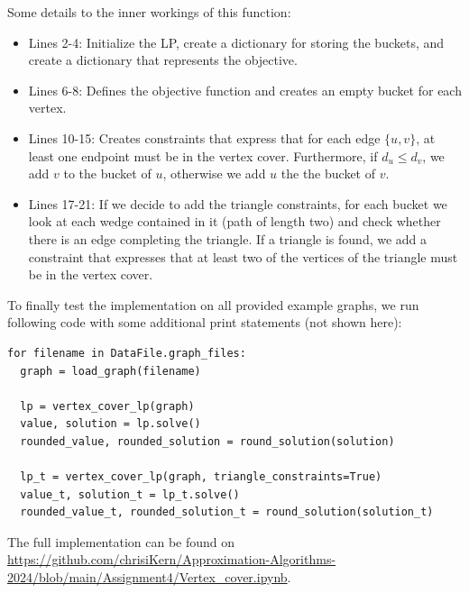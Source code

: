 \documentclass{article}
\begin{document}
Some details to the inner workings of this function:
\begin{itemize}
    \item Lines 2-4: Initialize the LP, create a dictionary for storing the buckets, and create a dictionary that represents the objective. 
    \item Lines 6-8: Defines the objective function and creates an empty bucket for each vertex.
    \item Lines 10-15: Creates constraints that express that for each edge $\{u,v\}$, at least one endpoint must be in the vertex cover. Furthermore, if $d_u \le d_v$, we add $v$ to the bucket of $u$, otherwise we add $u$ the the bucket of $v$.
    \item Lines 17-21: If we decide to add the triangle constraints, for each bucket we look at each wedge contained in it (path of length two) and check whether there is an edge completing the triangle. If a triangle is found, we add a constraint that expresses that at least two of the vertices of the triangle must be in the vertex cover. 
\end{itemize}

To finally test the implementation on all provided example graphs, we run following code with some additional print statements (not shown here):

\begin{lstlisting}
for filename in DataFile.graph_files:
  graph = load_graph(filename)
  
  lp = vertex_cover_lp(graph)
  value, solution = lp.solve()
  rounded_value, rounded_solution = round_solution(solution)
  
  lp_t = vertex_cover_lp(graph, triangle_constraints=True)
  value_t, solution_t = lp_t.solve()
  rounded_value_t, rounded_solution_t = round_solution(solution_t)
\end{lstlisting}
\vspace{0.5em}

The full implementation can be found on \url{https://github.com/chrisiKern/Approximation-Algorithms-2024/blob/main/Assignment4/Vertex_cover.ipynb}.
\vspace{3em}

\noindent{}
\vspace{1em}
\end{document}
